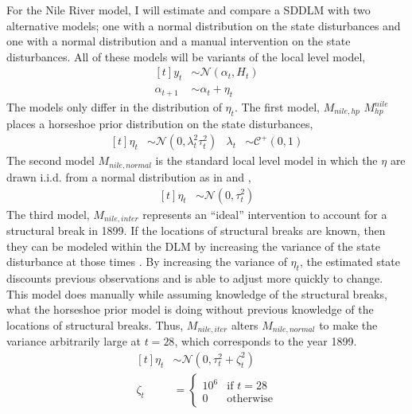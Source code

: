 \documentclass{article}
\newcommand{\dist}[1]{\mathcal{#1}}
\newcommand{\paren}[1]{\ensuremath{\left(#1\right)}}
\newcommand{\dnorm}[1]{\ensuremath{\dist{N}\paren{#1}}}
\newcommand{\dhalfcauchy}[1]{\ensuremath{\dist{C}^{+}\paren{#1}}}
\begin{document}
For the Nile River model, I will estimate and compare a SDDLM with two alternative models; one with a normal distribution on the state disturbances and one with a normal distribution and a manual intervention on the state disturbances.
All of these models will be variants of the local level model,
\begin{equation}
  \label{eq:21}
  \begin{aligned}[t]
    y_{t} &\sim \dnorm{\alpha_{t}, H_{t}} \\
    \alpha_{t + 1} &\sim \alpha_{t} + \eta_{t}
  \end{aligned}
\end{equation}
The models only differ in the distribution of $\eta_{t}$.
The first model, $M_{nile,hp}$ $M^{nile}_{hp}$ places a horseshoe prior distribution on the state disturbances,
\begin{equation}
  \label{eq:22}
  \begin{aligned}[t]
    \eta_{t} & \sim \dnorm{0, \lambda^{2}_{t} \tau_{t}^{2}} & \lambda_{t} & \sim \dhalfcauchy{0, 1}
  \end{aligned}
\end{equation}
The second model $M_{nile,normal}$ is the standard local level model in which the $\eta$ are drawn i.i.d. from a normal distribution as in \textcite{DurbinKoopman2001} and \textcite{petris2011state},
\begin{equation}
  \label{eq:9}
  \begin{aligned}[t]
    \eta_{t} & \sim \dnorm{0, \tau_{t}^{2}}
  \end{aligned}
\end{equation}
The third model, $M_{nile,inter}$ represents an ``ideal'' intervention to account for a structural break in 1899.
If the locations of structural breaks are known, then they can be modeled within the DLM by increasing the variance of the state disturbance at those times \textcite[Chapter 11][]{WestHarrison1997}.
By increasing the variance of $\eta_{t}$, the estimated state discounts previous observations and is able to adjust more quickly to change.
This model does manually while assuming knowledge of the structural breaks, what the horseshoe prior model is doing without previous knowledge of the locations of structural breaks.
Thus, $M_{nile,iter}$ alters $M_{nile,normal}$ to make the variance arbitrarily large at $t = 28$, which corresponds to the year 1899.
\begin{equation}
  \label{eq:12}
  \begin{aligned}[t]
    \eta_{t} & \sim \dnorm{0, \tau_{t}^{2} + \zeta_{t}^{2}} \\
    \zeta_{t} & = 
    \begin{cases}
      10^{6} & \text{if $t = 28$} \\
      0 & \text{otherwise}
    \end{cases}
  \end{aligned}
\end{equation}
\end{document}
